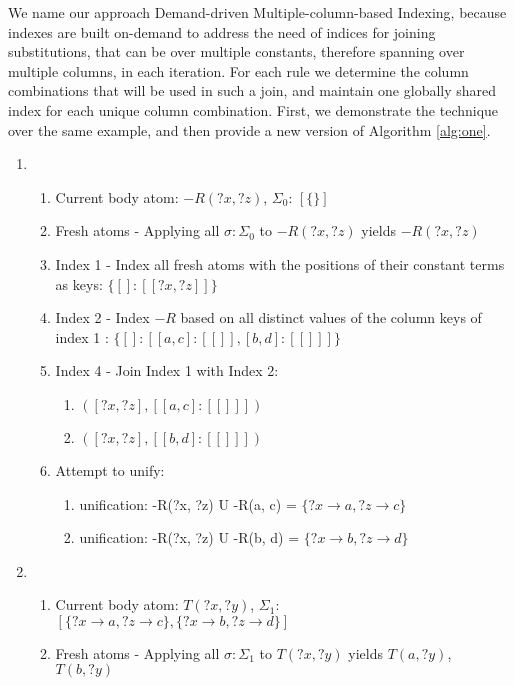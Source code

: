 \documentclass[sigconf,screen,review=false,natbib]{acmart}
\theoremstyle{definition}
\begin{document}
We name our approach Demand-driven Multiple-column-based Indexing, because indexes are built on-demand to address the need of indices for
joining substitutions, that can be over multiple constants, therefore spanning over multiple columns, in each iteration. For each rule we determine
the column combinations that will be used in such a join, and maintain one globally shared index for each unique column combination. First, we
demonstrate the technique over the same example, and then provide a new version of Algorithm \ref{alg:one}.
\begin{enumerate}
	\item \begin{enumerate}
		      \item Current body atom: $-R(?x, ?z)$, $\Sigma_0$: $[\{\}]$
		      \item Fresh atoms - Applying all $\sigma : \Sigma_0$ to $-R(?x, ?z)$ yields $-R(?x, ?z)$
		      \item Index 1 - Index all fresh atoms with the positions of their constant terms as keys: $\{[] : [[?x, ?z]]\}$
		      \item Index 2 - Index $-R$ based on all distinct values of the column keys of index 1 : $\{[]: [[a, c] : [[]], [b, d] : [[]]]\}$
		      \item Index 4 - Join Index 1 with Index 2:
		            \begin{enumerate}
			            \item $([?x, ?z], [[a, c] : [[]]])$
			            \item $([?x, ?z], [[b, d] : [[]]])$
		            \end{enumerate}
		      \item Attempt to unify:
		            \begin{enumerate}
			            \item unification: -R(?x, ?z) U -R(a, c) = $\{?x \rightarrow a, ?z \rightarrow c\}$
			            \item unification: -R(?x, ?z) U -R(b, d) = $\{?x \rightarrow b, ?z \rightarrow d\}$
		            \end{enumerate}
	      \end{enumerate}
	\item \begin{enumerate}
		      \item Current body atom: $T(?x, ?y)$, $\Sigma_1$: $[\{?x \rightarrow a, ?z \rightarrow c\}, \{?x \rightarrow b, ?z \rightarrow d\}]$
		      \item Fresh atoms - Applying all $\sigma : \Sigma_1$ to $T(?x, ?y)$ yields $T(a, ?y)$, $T(b, ?y)$

\end{enumerate}
\end{enumerate}
\end{document}
